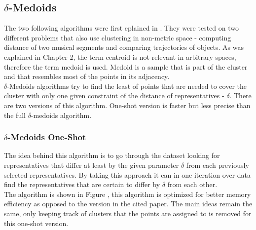 \documentclass[thesis=B,english]{FITthesis}[2012/10/20]
\begin{document}
\subsection{$\delta$-Medoids}           
The two following algorithms were first eplained in \cite{liebman2015representative}.
They were tested on two different problems that also use clustering in non-metric space - computing distance of two musical segments and comparing trajectories of objects.
As was explained in Chapter 2, the term centroid is not relevant in arbitrary spaces, therefore the term medoid is used.
Medoid is a sample that is part of the cluster and that resembles most of the points in its adjacency. \\

$\delta$-Medoids algorithms try to find the least of points that are needed to cover the cluster with only one given constraint of the distance of representatives - $\delta$.
There are two versions of this algorithm.
One-shot version is faster but less precise than the full $\delta$-medoids algorithm.

\subsubsection{$\delta$-Medoids One-Shot}

The idea behind this algorithm is to go through the dataset looking for representatives that differ at least by the given parameter $\delta$ from each previously selected representatives.
By taking this approach it can in one iteration over data find the representatives that are certain to differ by $\delta$ from each other. \\

The algorithm is shown in Figure , this algorithm is optimized for better memory efficiency as opposed to the version in the cited paper.
The main ideas remain the same, only keeping track of clusters that the points are assigned to is removed for this one-shot version.
\end{document}
